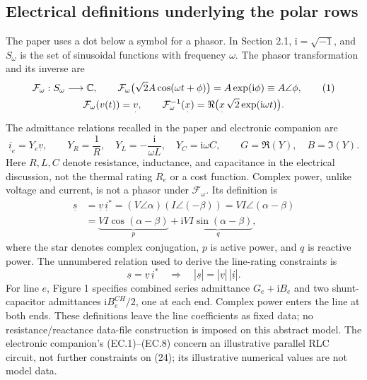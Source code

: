 \documentclass{article}
\begin{document}
\subsection*{Electrical definitions underlying the polar rows}
The paper uses a dot below a symbol for a phasor. In Section 2.1, $\mathrm i=\sqrt{-1}$, and $S_\omega$ is the set of sinusoidal functions with frequency $\omega$. The phasor transformation and its inverse are
\begin{gather}
\mathcal F_\omega:S_\omega\longrightarrow\mathbb C,\qquad
\mathcal F_\omega\bigl(\sqrt2 A\cos(\omega t+\phi)\bigr)
=A\exp(\mathrm i\phi)\equiv A\angle\phi,\tag{1}\\
\mathcal F_\omega(v(t))=\underset{\cdot}{v},\qquad
\mathcal F_\omega^{-1}(\underset{\cdot}{x})
=\Re\bigl(\underset{\cdot}{x}\,\sqrt2\exp(\mathrm i\omega t)\bigr).\notag
\end{gather}
The admittance relations recalled in the paper and electronic companion are
\[
\underset{\cdot}{i}_e=Y_e\underset{\cdot}{v},\qquad
Y_R=\frac1R,\quad Y_L=-\frac{\mathrm i}{\omega L},\quad Y_C=\mathrm i\omega C,
\qquad G=\Re(Y),\quad B=\Im(Y).
\]
Here $R,L,C$ denote resistance, inductance, and capacitance in the electrical discussion, not the thermal rating $R_e$ or a cost function. Complex power, unlike voltage and current, is not a phasor under $\mathcal F_\omega$. Its definition is
\begin{equation}
\begin{aligned}
\underset{\cdot}{s}
&=\underset{\cdot}{v}\,\underset{\cdot}{i}^{*}
=(V\angle\alpha)(I\angle(-\beta))
=VI\angle(\alpha-\beta)\\
&=\underbrace{VI\cos(\alpha-\beta)}_{p}
+\mathrm i\underbrace{VI\sin(\alpha-\beta)}_{q},
\end{aligned}\tag{3}
\end{equation}
where the star denotes complex conjugation, $p$ is active power, and $q$ is reactive power. The unnumbered relation used to derive the line-rating constraints is
\[
\underset{\cdot}{s}=\underset{\cdot}{v}\,\underset{\cdot}{i}^{*}
\quad\Longrightarrow\quad
|\underset{\cdot}{s}|=|\underset{\cdot}{v}|\,|\underset{\cdot}{i}|.
\]
For line $e$, Figure 1 specifies combined series admittance $G_e+\mathrm i B_e$ and two shunt-capacitor admittances $\mathrm i B_e^{CH}/2$, one at each end. Complex power enters the line at both ends. These definitions leave the line coefficients as fixed data; no resistance/reactance data-file construction is imposed on this abstract model. The electronic companion's (EC.1)--(EC.8) concern an illustrative parallel RLC circuit, not further constraints on (24); its illustrative numerical values are not model data.
\end{document}
